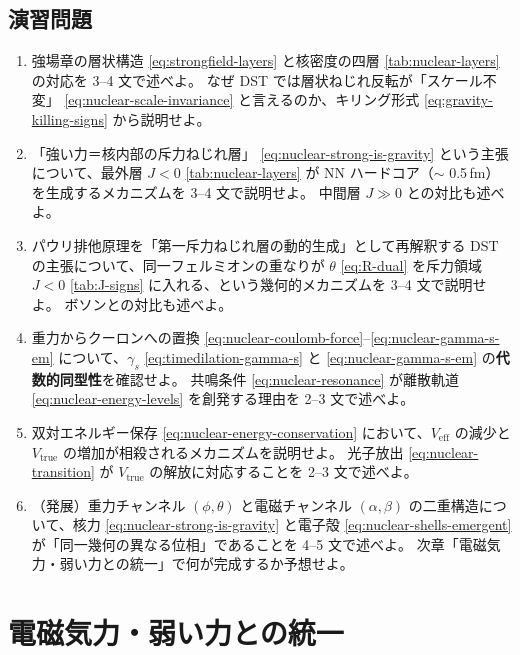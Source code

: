 \documentclass[dvipdfmx,a4paper,oneside]{jsbook}
\numberwithin{equation}{chapter}
\begin{document}
\section*{演習問題}

\begin{enumerate}[leftmargin=2em]
  \item 強場章の層状構造 \eqref{eq:strongfield-layers} と核密度の四層 \eqref{tab:nuclear-layers} の対応を 3--4 文で述べよ。
  なぜ DST では層状ねじれ反転が「スケール不変」 \eqref{eq:nuclear-scale-invariance} と言えるのか、キリング形式 \eqref{eq:gravity-killing-signs} から説明せよ。

  \item 「強い力＝核内部の斥力ねじれ層」 \eqref{eq:nuclear-strong-is-gravity} という主張について、最外層 \(J < 0\) \eqref{tab:nuclear-layers} が NN ハードコア（\(\sim\) 0.5\,fm）を生成するメカニズムを 3--4 文で説明せよ。
  中間層 \(J \gg 0\) との対比も述べよ。

  \item パウリ排他原理を「第一斥力ねじれ層の動的生成」として再解釈する DST の主張について、同一フェルミオンの重なりが \(\theta\) \eqref{eq:R-dual} を斥力領域 \(J < 0\) \eqref{tab:J-signs} に入れる、という幾何的メカニズムを 3--4 文で説明せよ。
  ボソンとの対比も述べよ。

  \item 重力からクーロンへの置換 \eqref{eq:nuclear-coulomb-force}–\eqref{eq:nuclear-gamma-s-em} について、\(\gamma_s\) \eqref{eq:timedilation-gamma-s} と \eqref{eq:nuclear-gamma-s-em} の\textbf{代数的同型性}を確認せよ。
  共鳴条件 \eqref{eq:nuclear-resonance} が離散軌道 \eqref{eq:nuclear-energy-levels} を創発する理由を 2--3 文で述べよ。

  \item 双対エネルギー保存 \eqref{eq:nuclear-energy-conservation} において、\(V_{\mathrm{eff}}\) の減少と \(V_{\mathrm{true}}\) の増加が相殺されるメカニズムを説明せよ。
  光子放出 \eqref{eq:nuclear-transition} が \(V_{\mathrm{true}}\) の解放に対応することを 2--3 文で述べよ。

  \item （発展）重力チャンネル \((\phi, \theta)\) と電磁チャンネル \((\alpha, \beta)\) の二重構造について、核力 \eqref{eq:nuclear-strong-is-gravity} と電子殻 \eqref{eq:nuclear-shells-emergent} が「同一幾何の異なる位相」であることを 4--5 文で述べよ。
  次章「電磁気力・弱い力との統一」で何が完成するか予想せよ。
\end{enumerate}

\chapter{電磁気力・弱い力との統一}
\end{document}
